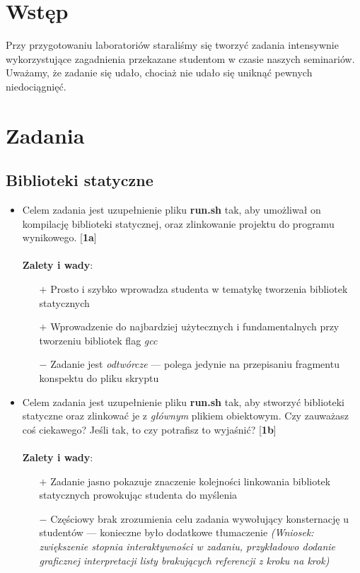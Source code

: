 \documentclass[12pt]{article}
\begin{document}


\section{Wstęp}
Przy przygotowaniu laboratoriów staraliśmy się tworzyć zadania intensywnie
wykorzystujące zagadnienia przekazane studentom w czasie naszych seminariów.
Uważamy, że zadanie się udało, chociaż nie udało się uniknąć pewnych
niedociągnięć.

\section{Zadania}
\subsection{Biblioteki statyczne}
\begin{itemize}
\item Celem zadania jest uzupełnienie pliku \textbf{run.sh} tak, aby umożliwał
  on kompilację biblioteki statycznej, oraz zlinkowanie projektu do programu
  wynikowego. [\textbf{1a}]\\ \\
  \textbf{Zalety i wady}:
  \begin{itemize}
  \item[$+$] Prosto i szybko wprowadza studenta w tematykę tworzenia bibliotek
    statycznych
  \item[$+$] Wprowadzenie do najbardziej użytecznych i fundamentalnych przy
    tworzeniu bibliotek flag \textit{gcc}
  \item[$-$] Zadanie jest \textit{odtwórcze} --- polega jedynie na przepisaniu
    fragmentu konspektu do pliku skryptu
  \end{itemize}
\item Celem zadania jest uzupełnienie pliku \textbf{run.sh} tak, aby stworzyć
  biblioteki statyczne oraz zlinkować je z \textit{głównym} plikiem obiektowym.
  Czy zauważasz coś ciekawego? Jeśli tak, to czy potrafisz to wyjaśnić?
  [\textbf{1b}]\\ \\
  \textbf{Zalety i wady}:
  \begin{itemize}
  \item[$+$] Zadanie jasno pokazuje znaczenie kolejności linkowania bibliotek
    statycznych prowokując studenta do myślenia
  \item[$-$] Częściowy brak zrozumienia celu zadania wywołujący konsternację u
    studentów --- konieczne było dodatkowe tłumaczenie \textit{(Wniosek:
      zwiększenie stopnia interaktywności w zadaniu, przykładowo dodanie
      graficznej interpretacji listy brakujących referencji z kroku na krok)}
  \end{itemize}
\end{itemize}
\end{document}
